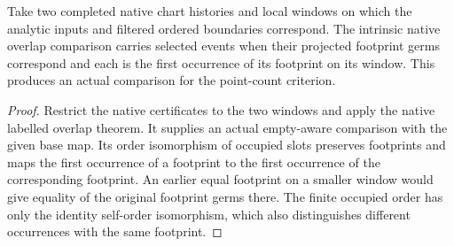 \begin{theorem}
\label{hir:g8-native-local-first-footprint-comparison}
\leanok
Take two completed native chart histories and local windows on
which the analytic inputs and filtered ordered boundaries
correspond. The intrinsic native overlap comparison carries
selected events when their projected footprint germs correspond
and each is the first occurrence of its footprint on its window.
This produces an actual comparison for the point-count criterion.
\end{theorem}
\begin{proof}
Restrict the native certificates to the two windows and apply
the native labelled overlap theorem. It supplies an actual
empty-aware comparison with the given base map. Its order
isomorphism of occupied slots preserves footprints and maps
the first occurrence of a footprint to the first occurrence
of the corresponding footprint. An earlier equal footprint
on a smaller window would give equality of the original
footprint germs there. The finite occupied order has only
the identity self-order isomorphism, which also distinguishes
different occurrences with the same footprint.
\end{proof}

